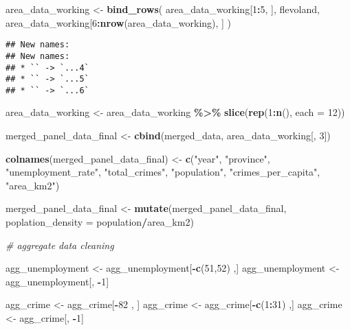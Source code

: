 \documentclass[
]{article}
\newenvironment{Shaded}{\begin{snugshade}}{\end{snugshade}}
\newcommand{\AttributeTok}[1]{\textcolor[rgb]{0.13,0.29,0.53}{#1}}
\newcommand{\CommentTok}[1]{\textcolor[rgb]{0.56,0.35,0.01}{\textit{#1}}}
\newcommand{\DecValTok}[1]{\textcolor[rgb]{0.00,0.00,0.81}{#1}}
\newcommand{\FunctionTok}[1]{\textcolor[rgb]{0.13,0.29,0.53}{\textbf{#1}}}
\newcommand{\NormalTok}[1]{#1}
\newcommand{\OtherTok}[1]{\textcolor[rgb]{0.56,0.35,0.01}{#1}}
\newcommand{\SpecialCharTok}[1]{\textcolor[rgb]{0.81,0.36,0.00}{\textbf{#1}}}
\newcommand{\StringTok}[1]{\textcolor[rgb]{0.31,0.60,0.02}{#1}}
\begin{document}
\begin{Shaded}
\begin{Highlighting}[]
\NormalTok{area\_data\_working }\OtherTok{\textless{}{-}} \FunctionTok{bind\_rows}\NormalTok{(}
\NormalTok{  area\_data\_working[}\DecValTok{1}\SpecialCharTok{:}\DecValTok{5}\NormalTok{, ], flevoland,  }
\NormalTok{  area\_data\_working[}\DecValTok{6}\SpecialCharTok{:}\FunctionTok{nrow}\NormalTok{(area\_data\_working), ]}
\NormalTok{)}
\end{Highlighting}
\end{Shaded}

\begin{verbatim}
## New names:
## New names:
## * `` -> `...4`
## * `` -> `...5`
## * `` -> `...6`
\end{verbatim}

\begin{Shaded}
\begin{Highlighting}[]
\NormalTok{area\_data\_working }\OtherTok{\textless{}{-}}\NormalTok{ area\_data\_working }\SpecialCharTok{\%\textgreater{}\%}
  \FunctionTok{slice}\NormalTok{(}\FunctionTok{rep}\NormalTok{(}\DecValTok{1}\SpecialCharTok{:}\FunctionTok{n}\NormalTok{(), }\AttributeTok{each =} \DecValTok{12}\NormalTok{))}

\NormalTok{merged\_panel\_data\_final }\OtherTok{\textless{}{-}} \FunctionTok{cbind}\NormalTok{(merged\_data, area\_data\_working[, }\DecValTok{3}\NormalTok{])}

\FunctionTok{colnames}\NormalTok{(merged\_panel\_data\_final) }\OtherTok{\textless{}{-}} \FunctionTok{c}\NormalTok{(}\StringTok{"year"}\NormalTok{, }\StringTok{"province"}\NormalTok{, }\StringTok{"unemployment\_rate"}\NormalTok{, }\StringTok{"total\_crimes"}\NormalTok{, }\StringTok{"population"}\NormalTok{, }\StringTok{"crimes\_per\_capita"}\NormalTok{, }\StringTok{"area\_km2"}\NormalTok{)}

\NormalTok{merged\_panel\_data\_final }\OtherTok{\textless{}{-}} \FunctionTok{mutate}\NormalTok{(merged\_panel\_data\_final, }\AttributeTok{poplation\_density =}\NormalTok{ population}\SpecialCharTok{/}\NormalTok{area\_km2)}

\CommentTok{\# aggregate data cleaning}

\NormalTok{agg\_unemployment }\OtherTok{\textless{}{-}}\NormalTok{ agg\_unemployment[}\SpecialCharTok{{-}}\FunctionTok{c}\NormalTok{(}\DecValTok{51}\NormalTok{,}\DecValTok{52}\NormalTok{) ,]}
\NormalTok{agg\_unemployment }\OtherTok{\textless{}{-}}\NormalTok{ agg\_unemployment[, }\SpecialCharTok{{-}}\DecValTok{1}\NormalTok{]}

\NormalTok{agg\_crime }\OtherTok{\textless{}{-}}\NormalTok{ agg\_crime[}\SpecialCharTok{{-}}\DecValTok{82}\NormalTok{ , ]}
\NormalTok{agg\_crime }\OtherTok{\textless{}{-}}\NormalTok{ agg\_crime[}\SpecialCharTok{{-}}\FunctionTok{c}\NormalTok{(}\DecValTok{1}\SpecialCharTok{:}\DecValTok{31}\NormalTok{) ,]}
\NormalTok{agg\_crime }\OtherTok{\textless{}{-}}\NormalTok{ agg\_crime[, }\SpecialCharTok{{-}}\DecValTok{1}\NormalTok{]}


\end{Highlighting}
\end{Shaded}
\end{document}
